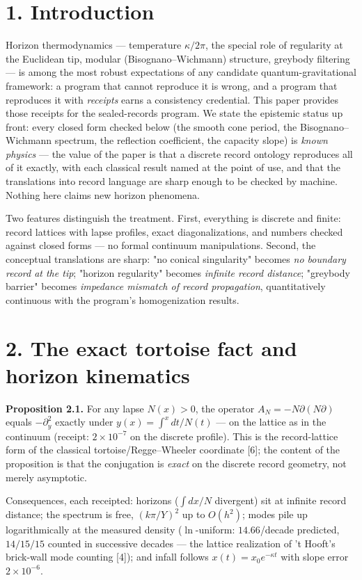 \documentclass[11pt]{article}
\begin{document}
\section*{1. Introduction}
Horizon thermodynamics — temperature $\kappa/2\pi$, the special role of regularity at the Euclidean tip, modular (Bisognano–Wichmann) structure, greybody filtering — is among the most robust expectations of any candidate quantum-gravitational framework: a program that cannot reproduce it is wrong, and a program that reproduces it with \emph{receipts} earns a consistency credential.  This paper provides those receipts for the sealed-records program.  We state the epistemic status up front: every closed form checked below (the smooth cone period, the Bisognano–Wichmann spectrum, the reflection coefficient, the capacity slope) is \emph{known physics} — the value of the paper is that a discrete record ontology reproduces all of it exactly, with each classical result named at the point of use, and that the translations into record language are sharp enough to be checked by machine.  Nothing here claims new horizon phenomena.

Two features distinguish the treatment.  First, everything is discrete and finite: record lattices with lapse profiles, exact diagonalizations, and numbers checked against closed forms — no formal continuum manipulations.  Second, the conceptual translations are sharp: "no conical singularity" becomes \emph{no boundary record at the tip}; "horizon regularity" becomes \emph{infinite record distance}; "greybody barrier" becomes \emph{impedance mismatch of record propagation}, quantitatively continuous with the program's homogenization results.

\section*{2. The exact tortoise fact and horizon kinematics}
\textbf{Proposition 2.1.}  For any lapse $N(x) > 0$, the operator $A_N = -N\partial(N\partial)$ equals $-\partial_y^2$ exactly under $y(x) = \int^x dt/N(t)$ — on the lattice as in the continuum (receipt: $2\times 10^{-7}$ on the discrete profile).  This is the record-lattice form of the classical tortoise/Regge–Wheeler coordinate [6]; the content of the proposition is that the conjugation is \emph{exact} on the discrete record geometry, not merely asymptotic.

Consequences, each receipted: horizons ($\int dx/N$ divergent) sit at infinite record distance; the spectrum is free, $(k\pi/Y)^2$ up to $O(h^2)$; modes pile up logarithmically at the measured density ($\ln$-uniform: $14.66$/decade predicted, $14/15/15$ counted in successive decades — the lattice realization of 't Hooft's brick-wall mode counting [4]); and infall follows $x(t) = x_0e^{-\kappa t}$ with slope error $2\times 10^{-6}$.
\end{document}

